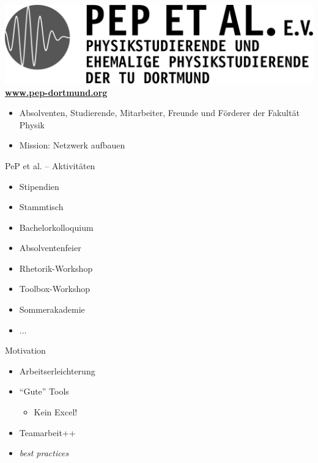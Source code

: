 \begin{frame}
  \begin{center}
    \includegraphics[width=.5\paperwidth]{logos/pep.pdf} \\
    \color{TUgreen}\textbf{\href{http://pep-dortmund.org}{www.pep-dortmund.org}}
  \end{center}
  \begin{itemize}
    \item Absolventen, Studierende, Mitarbeiter, Freunde und Förderer der Fakultät Physik
    \item Mission: Netzwerk aufbauen
  \end{itemize}
\end{frame}

\begin{frame}{PeP et al. -- Aktivitäten}
    \begin{itemize}
        \item Stipendien
        \item Stammtisch
        \item Bachelorkolloquium
        \item Absolventenfeier
        \item Rhetorik-Workshop
        \item Toolbox-Workshop
        \item Sommerakademie
        \item ...
    \end{itemize}
\end{frame}

\begin{frame}{Motivation}
  \begin{itemize}
    \item Arbeitserleichterung
    \item ``Gute'' Tools \begin{itemize}
      \item Kein Excel!
    \end{itemize}
  \item Teamarbeit++
  \item \textit{best practices}
  \end{itemize}  
\end{frame}
